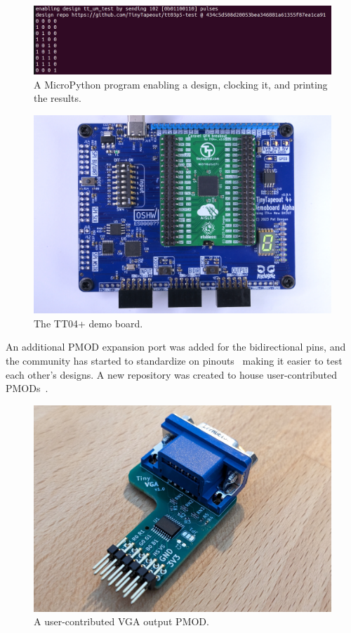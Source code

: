 \begin{figure}[htp]
\centering
\includegraphics[width=\columnwidth]{./Figs/tt3p5 enable design.png}
\caption{A MicroPython program enabling a design, clocking it, and printing the results.}
\label{fig:micropython_program}
\end{figure}

\begin{figure}[htp]
\centering
\includegraphics[width=\columnwidth]{./Figs/tt04-demoboard-top.jpg}
\caption{The TT04+ demo board.}
\label{fig:TT04plus_demo_board}
\end{figure}

An additional PMOD expansion port was added for the bidirectional pins, and the community has started to standardize on pinouts~\cite{pinouts} making it easier to test each other's designs.
A new repository was created to house user-contributed PMODs~\cite{awesomepmods}.

\begin{figure}[htp]
\centering
\includegraphics[width=\columnwidth]{./Figs/tiny_vga_pmod.jpg}
\caption{A user-contributed VGA output PMOD.}
\label{fig:user_contributed_VGA_PMOD}
\end{figure}

